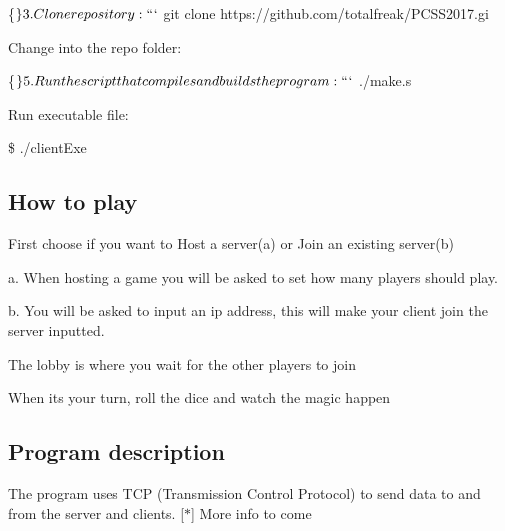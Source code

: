 \begin{DoxyCode}
\{$\}

3. Clone repository:

```$ git clone https://github.com/totalfreak/PCSS2017.gi
\end{DoxyCode}



\begin{DoxyEnumerate}
\item Change into the repo folder\+:
\end{DoxyEnumerate}


\begin{DoxyCode}
\{$\}

5. Run the script that compiles and builds the program:

```$ ./make.s
\end{DoxyCode}



\begin{DoxyEnumerate}
\item Run executable file\+:
\end{DoxyEnumerate}

{\ttfamily \$ ./client\+Exe}

\subsection*{How to play}


\begin{DoxyEnumerate}
\item First choose if you want to Host a server(a) or Join an existing server(b)

a. When hosting a game you will be asked to set how many players should play.

b. You will be asked to input an ip address, this will make your client join the server inputted.
\item The lobby is where you wait for the other players to join
\item When it\textquotesingle{}s your turn, roll the dice and watch the magic happen
\end{DoxyEnumerate}

\subsection*{Program description}

The program uses T\+CP (Transmission Control Protocol) to send data to and from the server and clients. \mbox{[}$\ast$\mbox{]} More info to come

